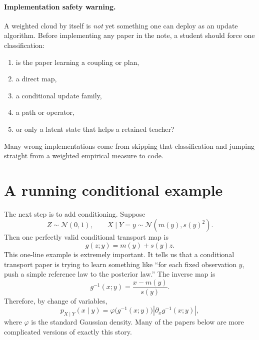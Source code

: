 \documentclass[11pt]{report}
\begin{document}
\paragraph{Implementation safety warning.}
A weighted cloud by itself is \emph{not} yet something one can deploy as an update
algorithm.  Before implementing any paper in the note, a student should force one
classification:
\begin{enumerate}[label=(\roman*)]
  \item is the paper learning a coupling or plan,
  \item a direct map,
  \item a conditional update family,
  \item a path or operator,
  \item or only a latent state that helps a retained teacher?
\end{enumerate}
Many wrong implementations come from skipping that classification and jumping
straight from a weighted empirical measure to code.

\section{A running conditional example}

The next step is to add conditioning.  Suppose
\begin{equation}
Z \sim \mathcal N(0,1),
\qquad
X\mid Y=y \sim \mathcal N(m(y),s(y)^2).
\label{eq:running-conditional-law}
\end{equation}
Then one perfectly valid conditional transport map is
\begin{equation}
g(z;y) = m(y) + s(y)z.
\label{eq:running-conditional-map}
\end{equation}
This one-line example is extremely important.  It tells us that a conditional
transport paper is trying to learn something like ``for each fixed observation
$y$, push a simple reference law to the posterior law.''  The inverse map is
\begin{equation}
g^{-1}(x;y)=\frac{x-m(y)}{s(y)}.
\label{eq:running-conditional-inverse}
\end{equation}
Therefore, by change of variables,
\begin{equation}
p_{X\mid Y}(x\mid y)
=
\varphi\!\bigl(g^{-1}(x;y)\bigr)
\left|\partial_x g^{-1}(x;y)\right|,
\label{eq:running-change-of-variables}
\end{equation}
where $\varphi$ is the standard Gaussian density.  Many of the papers below are
more complicated versions of exactly this story.
\end{document}
